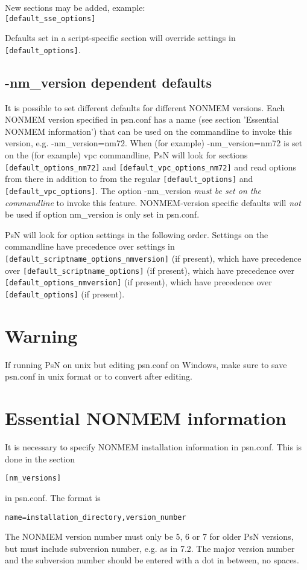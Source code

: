 \noindent New sections may be added, example:\\
\verb|[default_sse_options]|

\noindent Defaults set in a script-specific section will override settings in \verb|[default_options]|.
\subsection{-nm\_version dependent defaults}
It is possible to set different defaults for different NONMEM versions. Each NONMEM version specified in psn.conf has a name
(see section 'Essential NONMEM information') that can be used on the commandline to invoke this version, e.g. -nm\_version=nm72.
When (for example) -nm\_version=nm72 is set on the (for example) vpc commandline, PsN will look for sections \verb|[default_options_nm72]| 
and \verb|[default_vpc_options_nm72]| and read options from there in addition to 
from the regular \verb|[default_options]| and \verb|[default_vpc_options]|. The option -nm\_version \emph{must be set on the commandline}
to invoke this feature. NONMEM-version specific defaults will \emph{not} be used if option nm\_version is only set in psn.conf.

PsN will look for option settings in the following order.
Settings on the commandline have precedence over settings in 
\verb|[default_scriptname_options_nmversion]| (if present), which have precedence over 
\verb|[default_scriptname_options]| (if present), which have precedence over
\verb|[default_options_nmversion]| (if present), which have precedence over \verb|[default_options]| (if present). 

\section{Warning}
If running PsN on unix but editing psn.conf on Windows, make sure to save psn.conf in unix format or to convert after editing.




\section{Essential NONMEM information}
It is necessary to specify NONMEM installation information in psn.conf. This is done in the section
\begin{verbatim}
[nm_versions]
\end{verbatim}
in psn.conf. The format is 
\begin{verbatim}
name=installation_directory,version_number
\end{verbatim}
The NONMEM version number must only be 5, 6 or 7 for older PsN versions, but must include subversion number, e.g. as in 7.2. 
The major version number and the subversion number should be entered with a dot in between, no spaces.  

